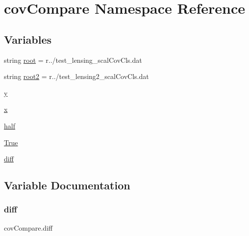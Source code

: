 \hypertarget{namespacecovCompare}{}\section{cov\+Compare Namespace Reference}
\label{namespacecovCompare}
\subsection*{Variables}
\begin{DoxyCompactItemize}
\item 
string \mbox{\hyperlink{namespacecovCompare_aec40521c70518a26e53013856f463e35}{root}} = r\textquotesingle{}../test\+\_\+lensing\+\_\+scal\+Cov\+Cls.\+dat\textquotesingle{}
\item 
string \mbox{\hyperlink{namespacecovCompare_a5defbe4923eee9fe3151e678fb88f360}{root2}} = r\textquotesingle{}../test\+\_\+lensing2\+\_\+scal\+Cov\+Cls.\+dat\textquotesingle{}
\item 
\mbox{\hyperlink{namespacecovCompare_aa2f292c828b2b07868de4be2596d204c}{y}}
\item 
\mbox{\hyperlink{namespacecovCompare_a22cccacaea7b79c159095d753a6a6cec}{x}}
\item 
\mbox{\hyperlink{namespacecovCompare_adc2e07cffcf4e58a7e3d237ba27d5a93}{half}}
\item 
\mbox{\hyperlink{namespacecovCompare_aca7ebf7e63e158e8bb306de0a1d4e0b5}{True}}
\item 
\mbox{\hyperlink{namespacecovCompare_a11fb3bec179e6ea631f27ca850df9fa9}{diff}}
\end{DoxyCompactItemize}


\subsection{Variable Documentation}
\mbox{\label{namespacecovCompare_a11fb3bec179e6ea631f27ca850df9fa9}} 
\subsubsection{\texorpdfstring{diff}{diff}}
{\footnotesize\ttfamily cov\+Compare.\+diff}

\mbox{\label{namespacecovCompare_adc2e07cffcf4e58a7e3d237ba27d5a93}} 
